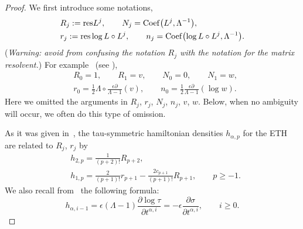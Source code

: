 \documentclass[11pt]{article}
\numberwithin{equation}{section}
\newcommand{\e}{\epsilon}
\newcommand{\p}{\partial}
\newcommand{\nn}{\nonumber}
\numberwithin{equation}{section}
\begin{document}
\begin{proof}
We first introduce some notations,
\begin{align*}
& R_j := {\rm res} L^j, \qquad N_j={\rm Coef}\bigl(L^j, \Lambda^{-1}\bigr), \\
& r_j:= {\rm res} \log L \circ L^j, \qquad n_j= {\rm Coef}\bigl(\log L \circ L^j, \Lambda^{-1}\bigr).
\end{align*}
({\it Warning: avoid from confusing the notation $R_j$ with the notation for the matrix resolvent.})
For example~ (see \cite{Carlet}),
\begin{align*}
& R_0=1, \qquad R_1=v, \qquad N_0=0, \qquad N_1=w, \\
& r_0= \frac12 \Lambda \circ \frac{\e\p}{\Lambda-1} (v), \qquad n_0 = \frac12 \frac{\e\p}{\Lambda-1} (\log w) .
\end{align*}
Here we omitted the arguments in $R_j$, $r_j$, $N_j$, $n_j$, $v$, $w$. Below, when
no ambiguity will occur, we often do this type of omission.

As it was given in~\cite{CDZ}, the tau-symmetric hamiltonian densities $h_{\alpha, p}$ for the ETH
are related to $R_j$, $r_j$ by
\begin{align}
& h_{2, p} = \frac1{(p+2)!} R_{p+2}, \label{CDZtausymm2}\\
& h_{1,p} = \frac2{(p+1)!} r_{p+1} - \frac{2c_{p+1}}{(p+1)!} R_{p+1}, \qquad p\ge-1.\nn
\end{align}
We also recall from~\cite{CDZ} the following formula:
\[
h_{\alpha,i-1} = \e(\Lambda-1) \frac{\p \log \tau}{\p t^{\alpha,i}} = - \e\frac{\p \sigma}{\p t^{\alpha,i}}, \qquad i\ge0.
\]


\end{proof}
\end{document}
